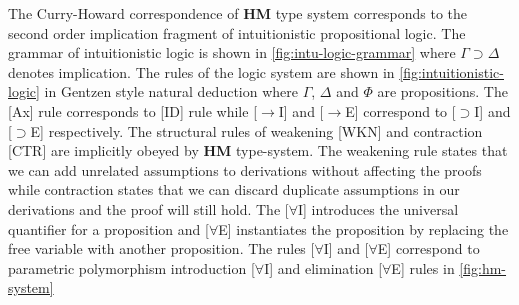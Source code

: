 The Curry-Howard correspondence of \textbf{HM} type system
corresponds to the second order implication fragment of intuitionistic propositional logic.
The grammar of intuitionistic logic is shown in \cref{fig:intu-logic-grammar} where $\Gamma \supset \Delta$ denotes implication.
The rules of the logic system are shown in \cref{fig:intuitionistic-logic} in Gentzen style natural deduction
where $\Gamma$, $\Delta$ and $\Phi$ are propositions. The [Ax] rule corresponds to [ID] rule while [$\rightarrow$I] and [$\rightarrow$E] correspond
to [$\supset$I] and [$\supset$E] respectively. The structural rules of weakening [WKN] and contraction [CTR] are implicitly obeyed
by \textbf{HM} type-system. The weakening rule states that we can add unrelated assumptions to derivations without
affecting the proofs while contraction states that we can discard duplicate assumptions in our derivations and the
proof will still hold. The [$\forall$I] introduces the universal quantifier for a proposition and [$\forall$E] instantiates
the proposition by replacing the free variable with another proposition. The rules [$\forall$I] and [$\forall$E] correspond to parametric polymorphism
introduction [$\forall$I] and elimination [$\forall$E] rules in \cref{fig:hm-system}

